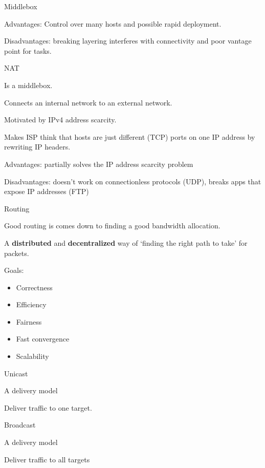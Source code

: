 \documentclass[main.tex]{subfiles}
\begin{document}
\begin{card}{Middlebox}
\item Advantages: Control over many hosts and possible rapid deployment.
\item Disadvantages: breaking layering interferes with connectivity and poor vantage point for tasks.
\end{card}

\begin{card}{NAT}
\item Is a middlebox.
\item Connects an internal network to an external network.
\item Motivated by IPv4 address scarcity.
\item Makes ISP think that hosts are just different (TCP) ports on one IP address by rewriting IP headers.
\item Advantages: partially solves the IP address scarcity problem
\item Disadvantages: doesn't work on connectionless protocols (UDP), breaks apps that expose IP addresses (FTP)
\end{card}

\begin{card}{Routing}
\item Good routing is comes down to finding a good bandwidth allocation.
\item A \textbf{distributed} and \textbf{decentralized} way of `finding the right path to take' for packets.
\item Goals:
    \begin{itemize}
        \item Correctness
        \item Efficiency
        \item Fairness
        \item Fast convergence
        \item Scalability
    \end{itemize}
\end{card}

\begin{card}{Unicast}
\item A delivery model
\item Deliver traffic to one target.
\end{card}

\begin{card}{Broadcast}
\item A delivery model
\item Deliver traffic to all targets
\end{card}
\end{document}
